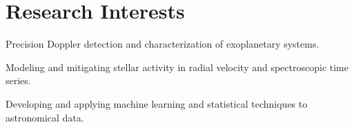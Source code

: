 \section{Research Interests}

\begin{onecolentry}
\begin{highlights}
    \item Precision Doppler detection and characterization of exoplanetary systems.
    \item Modeling and mitigating stellar activity in radial velocity and spectroscopic time series.
    \item Developing and applying machine learning and statistical techniques to astronomical data.
\end{highlights}
\end{onecolentry}
